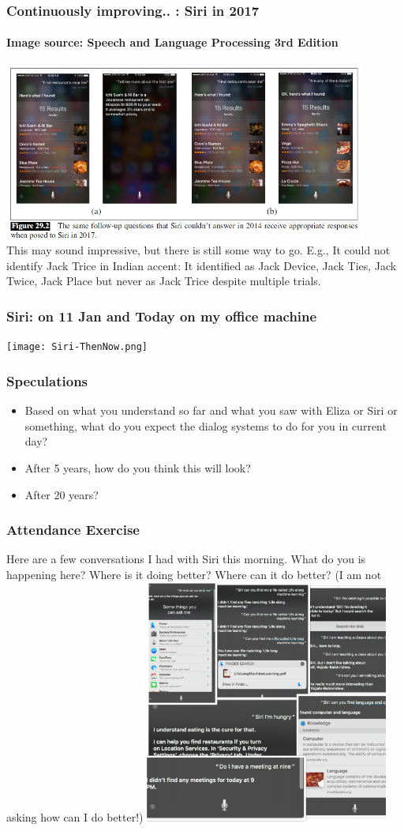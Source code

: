 \documentclass{beamer}
\begin{document}
\begin{frame}
\frametitle{Continuously improving.. : Siri in 2017}
\framesubtitle{Image source: Speech and Language Processing 3rd Edition}
\includegraphics[width=0.9\textwidth]{siri2017.png}
\pause \\ This may sound impressive, but there is still some way to go. E.g., It could not identify Jack Trice in Indian accent: It identified as Jack Device, Jack Ties, Jack Twice, Jack Place but never as Jack Trice despite multiple trials.
\end{frame}

\begin{frame}
\frametitle{Siri: on 11 Jan and Today on my office machine}
\texttt{[image: Siri-ThenNow.png]}
\end{frame}

\begin{frame}
\frametitle{Speculations}
\begin{itemize}
\item Based on what you understand so far and what you saw with Eliza or Siri or something, what do you expect the dialog systems to do for you in current day?
\item After 5 years, how do you think this will look? \pause
\item After 20 years? \pause
\end{itemize}
\end{frame}

\begin{frame}
\frametitle{Attendance Exercise}
Here are a few conversations I had with Siri this morning. What do you is happening here? Where is it doing better? Where can it do better? (I am not asking how can I do better!)
\includegraphics[width=0.6\textwidth]{collage-siri.png} 
\end{frame}
\end{document}
